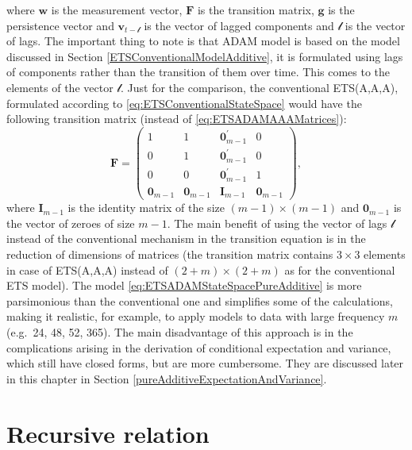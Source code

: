 \documentclass[
]{book}
\theoremstyle{definition}
\theoremstyle{definition}
\theoremstyle{definition}
\theoremstyle{definition}
\theoremstyle{remark}
\begin{document}
where \(\mathbf{w}\) is the measurement vector, \(\mathbf{F}\) is the transition matrix, \(\mathbf{g}\) is the persistence vector and \(\mathbf{v}_{t-\boldsymbol{\mathscr{l}}}\) is the vector of lagged components and \(\boldsymbol{\mathscr{l}}\) is the vector of lags. The important thing to note is that ADAM model is based on the model discussed in Section \ref{ETSConventionalModelAdditive}, it is formulated using lags of components rather than the transition of them over time. This comes to the elements of the vector \(\boldsymbol{\mathscr{l}}\). Just for the comparison, the conventional ETS(A,A,A), formulated according to \eqref{eq:ETSConventionalStateSpace} would have the following transition matrix (instead of \eqref{eq:ETSADAMAAAMatrices}):
\begin{equation}
  \mathbf{F} = \begin{pmatrix} 1 & 1 & \mathbf{0}^\prime_{m-1} & 0 \\ 0 & 1 & \mathbf{0}^\prime_{m-1} & 0 \\ 0 & 0 & \mathbf{0}^\prime_{m-1} & 1 \\ \mathbf{0}_{m-1} & \mathbf{0}_{m-1} & \mathbf{I}_{m-1} & \mathbf{0}_{m-1} \end{pmatrix},
  \label{eq:ETSADAMAAAMatricesTransition}
\end{equation}
where \(\mathbf{I}_{m-1}\) is the identity matrix of the size \((m-1) \times (m-1)\) and \(\mathbf{0}_{m-1}\) is the vector of zeroes of size \(m-1\). The main benefit of using the vector of lags \(\boldsymbol{\mathscr{l}}\) instead of the conventional mechanism in the transition equation is in the reduction of dimensions of matrices (the transition matrix contains \(3\times 3\) elements in case of ETS(A,A,A) instead of \((2+m)\times (2+m)\) as for the conventional ETS model). The model \eqref{eq:ETSADAMStateSpacePureAdditive} is more parsimonious than the conventional one and simplifies some of the calculations, making it realistic, for example, to apply models to data with large frequency \(m\) (e.g.~24, 48, 52, 365). The main disadvantage of this approach is in the complications arising in the derivation of conditional expectation and variance, which still have closed forms, but are more cumbersome. They are discussed later in this chapter in Section \ref{pureAdditiveExpectationAndVariance}.

\hypertarget{adamETSPureAdditiveRecursive}{%
\section{Recursive relation}\label{adamETSPureAdditiveRecursive}}
\end{document}
